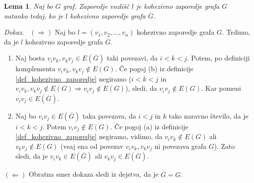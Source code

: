 \documentclass[a4paper, 12pt]{book}
\newtheorem{lema}{Lema}[chapter]
\newenvironment{dokaz}{\emph{Dokaz.}\ }{\hspace{\fill}{$\Box$}}
\begin{document}
\begin{lema}
\label{lema0}
    Naj bo $G$ graf. Zaporedje vozlišč $l$ je kohezivno zaporedje grafa $G$ natanko tedaj, ko je $l$ kohezivno zaporedje grafa $\overline{G}$. 
\end{lema}
\begin{dokaz}
    $(\Rightarrow)$ Naj bo $l = (v_1, v_2, ..., v_n)$ kohezivno zaporedje grafa $G$. Trdimo, da je $l$ kohezivno zaporedje grafa $\overline{G}$. 
    \begin{enumerate}[label=(\alph*)]
        \item Naj bosta $v_iv_k, v_kv_j \in E(\overline{G})$ taki povezavi, da $i < k < j$. Potem, po definiciji komplementa $v_iv_k, v_kv_j \notin E(G)$. Če pogoj (b) iz definicije \ref{def_kohezivno_zaporedje} negiramo ($i < k < j$ in $v_iv_k, v_kv_j \notin E(G) \Rightarrow v_iv_j \notin E(G)$), sledi, da $v_iv_j \notin E(G)$. Kar pomeni $v_iv_j \in E(\overline{G})$.
        \item Naj bo $v_iv_j \in E(\overline{G})$ taka povezava, da $i < j$ in $k$ tako naravno število, da je $i < k < j$. Potem $v_iv_j \notin E(G)$. Če pogoj (a) iz definicije \ref{def_kohezivno_zaporedje} negiramo, vidimo, da $v_iv_k \notin E(G)$ ali $v_kv_j \notin E(G)$ (vsaj ena od povezav $v_iv_k, v_kv_j$ ni povezava grafa $G$). Zato sledi, da je $v_iv_k \in E(\overline{G})$ ali $v_kv_j \in E(\overline{G})$. 
    \end{enumerate}

    $(\Leftarrow)$ Obratna smer dokaza sledi iz dejstva, da je $\overline{\overline{G}} = G$.
\end{dokaz}
\end{document}
